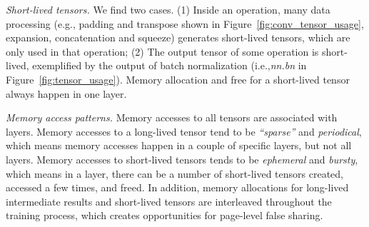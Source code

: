 \textcolor{check}{\textit{Short-lived tensors.}
We find two cases. (1) Inside an operation, many data processing (e.g., padding and transpose shown in Figure~\ref{fig:conv_tensor_usage}, expansion, concatenation and squeeze) generates short-lived tensors, which are only used in that operation; (2) The output tensor of some operation is short-lived, exemplified by the output of batch normalization (i.e.,\textit{nn.bn} in Figure~\ref{fig:tensor_usage}). Memory allocation and free for a short-lived tensor always happen in one layer.}

\textit{Memory access patterns.}
Memory accesses to all tensors are associated with layers. Memory accesses to a long-lived tensor tend to be \textcolor{check}{\textit{``sparse''} and \textit{periodical}}, which means memory accesses happen in a couple of specific layers, but not all layers. Memory accesses to short-lived tensors tends to be \textcolor{check}{\textit{ephemeral} and \textit{bursty},} which means
in a layer, there can be a number of short-lived tensors created, accessed a few times, and freed. In addition, memory allocations for long-lived  intermediate results and short-lived tensors are interleaved throughout the training process, which creates opportunities for page-level false sharing.





